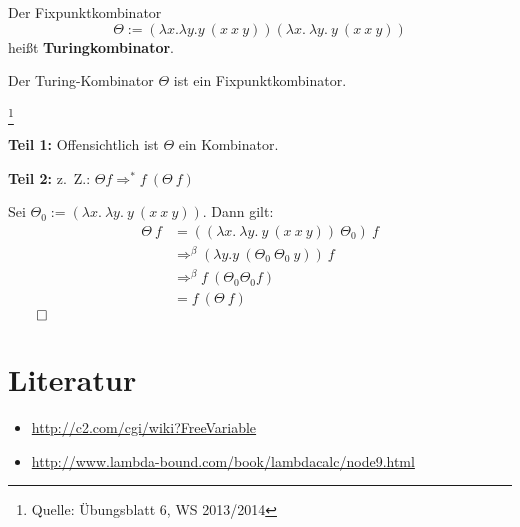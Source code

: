 \begin{definition}[Turingkombinator]%
    Der Fixpunktkombinator
    \[\Theta := (\lambda x. \lambda y. y\ (x\ x\ y)) (\lambda x.\ \lambda y.\ y\ (x\ x\ y))\]
    heißt \textbf{Turingkombinator}.
\end{definition}

\begin{behauptung}
    Der Turing-Kombinator $\Theta$ ist ein Fixpunktkombinator.
\end{behauptung}

\begin{beweis}\footnote{Quelle: Übungsblatt 6, WS 2013/2014}

    \textbf{Teil 1:} Offensichtlich ist $\Theta$ ein Kombinator.

    \textbf{Teil 2:} z.~Z.: $\Theta f \Rightarrow^* f \ (\Theta \ f)$

    Sei $\Theta_0 := (\lambda x.\ \lambda y.\ y\ (x\ x\ y))$. Dann gilt:
    \begin{align*}
        \Theta\ f &= ((\lambda x.\ \lambda y.\ y\ (x\ x\ y))\ \Theta_0)\ f\\
                 &\Rightarrow^\beta (\lambda y. y\ (\Theta_0 \ \Theta_0 \ y))\ f\\
                 &\Rightarrow^\beta f \ (\Theta_0 \Theta_0 f)\\
                 &= f \ (\Theta \ f)
    \end{align*}
    $\qed$
\end{beweis}

\section{Literatur}

\begin{itemize}
    \item \url{http://c2.com/cgi/wiki?FreeVariable}
    \item \url{http://www.lambda-bound.com/book/lambdacalc/node9.html}
\end{itemize}